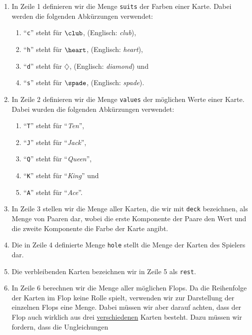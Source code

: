 \begin{enumerate}
\item In Zeile 1 definieren wir die Menge \texttt{suits} der Farben einer Karte.
      Dabei werden die folgenden Abkürzungen verwendet:
      \begin{enumerate}
      \item ``\texttt{c}'' steht für $\club$, (Englisch: \emph{club}),
      \item ``\texttt{h}'' steht für $\heart$, (Englisch: \emph{heart}), 
      \item ``\texttt{d}'' steht für $\diamondsuit$, (Englisch: \emph{diamond}) und
      \item ``\texttt{s}'' steht für $\spade$, (Englisch: \emph{spade}). 
      \end{enumerate} 
\item In Zeile 2 definieren wir die Menge \texttt{values} der möglichen Werte einer
      Karte.  Dabei wurden die folgenden Abkürzungen verwendet:
      \begin{enumerate}
      \item ``\texttt{T}'' steht für ``\emph{Ten}'',
      \item ``\texttt{J}'' steht für ``\emph{Jack}'',
      \item ``\texttt{Q}'' steht für ``\emph{Queen}'',
      \item ``\texttt{K}'' steht für ``\emph{King}'' und
      \item ``\texttt{A}'' steht für ``\emph{Ace}''.
      \end{enumerate}
\item In Zeile 3 stellen wir die Menge aller Karten, die wir mit \texttt{deck} bezeichnen,
      als Menge von Paaren dar, wobei die erste Komponente der Paare den Wert und die zweite Komponente 
      die Farbe der Karte angibt.
\item Die in Zeile 4 definierte Menge \texttt{hole} stellt die Menge der Karten des Spielers dar.
\item Die verbleibenden Karten bezeichnen wir in Zeile 5 als \texttt{rest}.
\item In Zeile 6 berechnen wir die Menge aller möglichen Flops.  Da die Reihenfolge der Karten im
      Flop keine Rolle spielt, verwenden wir zur Darstellung der einzelnen Flops eine Menge.
      Dabei müssen wir aber darauf achten, dass der Flop auch wirklich aus drei
      \underline{verschiedenen}  Karten besteht.  Dazu müssen wir fordern, dass die Ungleichungen
      \\[0.2cm]

\end{enumerate}
